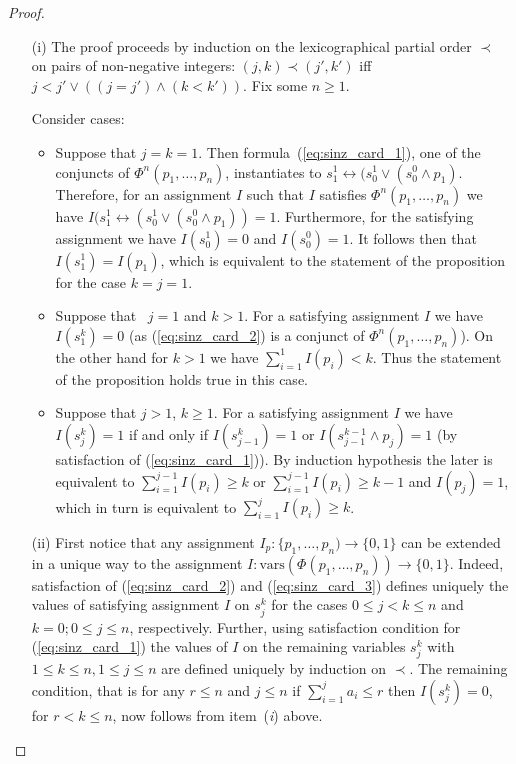 \documentclass{article} \usepackage[utf8]{inputenc}
\newcommand*{\csf}{\ensuremath{{s}}}
\newcommand*{\Sinz}{\ensuremath{\Phi}}
\newcommand*{\vars}{\ensuremath{\mathrm{vars}}}
\begin{document}
\begin{proof}
\begin{enumerate}
\item[(i)] The proof proceeds by induction on the lexicographical partial 
order $\prec$ on pairs of non-negative integers:
$(j,k) \prec (j',k')$  iff $j < j' \lor ((j = j') \land (k < k'))$. 
Fix some $n \ge 1 $.  

Consider cases: 

\begin{itemize}
\item   Suppose that  { $j=k=1$}. 
Then formula~(\ref{eq:sinz_card_1}), one
of the conjuncts of $\Phi^{n}(p_{1}, \ldots, p_{n})$, instantiates to
$s_{1}^{1} \leftrightarrow (s_{0}^{1} \lor (s_{0}^{0} \land p_{1})$. Therefore,
for an assignment $I$ such that 
$I $ satisfies $ \Phi^{n}(p_{1}, \ldots, p_{n})$
we have 
$I(s_{1}^{1} \leftrightarrow (s_{0}^{1} \lor (s_{0}^{0} \land p_{1})) = 1$.  
Furthermore, for the satisfying assignment we have
$I(s_{0}^{1}) = 0$ 
and
$I(s_{0}^{0}) = 1$. 
It follows then 
that
$I(s_{1}^{1}) = I(p_{1})$, 
which is equivalent to the statement of the proposition for
the case $k=j=1$.

\item Suppose that {\ $j=1$ and $k > 1$.} 
For a satisfying assignment $I$ we have $I(s_{1}^{k}) = 0$ 
(as (\ref{eq:sinz_card_2}) is a conjunct of $\Phi^{n}(p_{1}, \ldots, p_{n})$). 
On the other hand for $k > 1$ we have $\sum_{i=1}^1 I(p_i) <  k$.
Thus the statement of the proposition holds true in this case. 

\item  Suppose that 
{$j > 1$, $k \ge 1$.} For a satisfying assignment $I$ we
have $I(s_{j}^{k}) = 1$ if and only if  $I(s_{j-1}^{k}) =1$  or
$I(s_{j-1}^{k-1} \land p_{j}) = 1$ (by satisfaction of (\ref{eq:sinz_card_1})). By induction
hypothesis the later is equivalent to $\sum_{i=1}^{j-1} I(p_i) \geq k$ or
$\sum_{i=1}^{j-1} I(p_i) \geq k-1$ and $I(p_{j})=1$, which in turn is
equivalent to   $\sum_{i=1}^{j} I(p_i) \geq k$. 
\end{itemize}


\item[(ii)] First notice that any assignment $I_{p}: \{p_{1}, \ldots, p_{n})
\rightarrow \{0,1\}$ can be extended  in a unique way to the assignment
$I:\vars(\Sinz(p_1,\dots,p_n))\to \{0,1\}$. 
Indeed, satisfaction of (\ref{eq:sinz_card_2}) and (\ref{eq:sinz_card_3}) defines
uniquely the values of satisfying assignment $I$ on $s_{j}^{k}$ for the cases
$0\le j < k \le n$ and $k=0; 0 \le j \le n$, respectively.  Further, using
satisfaction condition for (\ref{eq:sinz_card_1}) the values of $I$ on the remaining  variables
$s_{j}^{k}$ with $1 \le k \le n, 1 \le j \le n$  are defined uniquely by
induction on $\prec$.  The remaining condition, that is for any $r\leq n$ and $j\leq n$ if
$\sum_{i=1}^j a_i \leq r$ then $I(\csf^k_j) = 0$, for $r<k\leq n$, now follows
from item~(\textit{i}) above.
\end{enumerate}
\end{proof}
\end{document}
